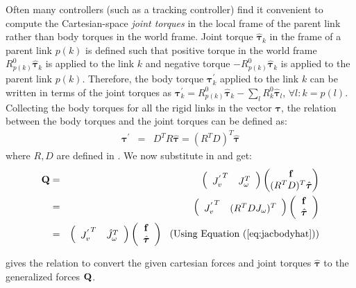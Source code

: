 Often many controllers (such as a tracking controller) find it convenient to compute the Cartesian-space \emph{joint torques} in the local frame of the parent link rather than body torques in the world frame. Joint torque $\hat{\bm{\tau}}_k$ in the frame of a parent link $p(k)$ is defined such that positive torque in the world frame $R^0_{p(k)}\hat{\bm{\tau}}_k$ is applied to the link $k$ and negative torque $-R^0_{p(k)}\hat{\bm{\tau}}_k$ is applied to the parent link $p(k)$. Therefore, the body torque $\bm{\tau}^{'}_k$ applied to the link $k$ can be written in terms of the joint torques as $\bm{\tau}^{'}_k = R^0_{p(k)}\hat{\bm{\tau}}_k - \sum_l R^0_{k} \hat{\bm{\tau}}_l$, $\forall l:k=p(l)$. Collecting the body torques for all the rigid links in the vector $\bm{\tau}$, the relation between the body torques and the joint torques can be defined as:
\begin{eqnarray}
\label{eq:torquesbodyhat}
\bm{\tau}^{'} & = & D^T R \hat{\bm{\tau}} = (R^T D)^T \hat{\bm{\tau}}
\end{eqnarray}
where $R, D$ are defined in . We now substitute  in  and get:
\begin{eqnarray}
\label{eq:torques_cart2gen}
\nonumber
\vc{Q} & = & 
\left (
\begin{array}{cc}
{J^{'}_{v}}^T & J_\omega^T
\end{array}
\right )
\begin{pmatrix}
\vc{f} \\
(R^T D)^T \hat{\bm{\tau}}
\end{pmatrix}
 \\
\nonumber
& = & 
\left (
\begin{array}{cc}
{J^{'}_{v}}^T & (R^T D J_\omega)^T
\end{array}
\right )
\left (
\begin{array}{c}
\vc{f} \\
\hat{\bm{\tau}}
\end{array}
\right )
\\
& = & 
\left (
\begin{array}{cc}
{J^{'}_{v}}^T & \hat{J}_\omega^T
\end{array}
\right )
\left (
\begin{array}{c}
\vc{f} \\
\hat{\bm{\tau}}
\end{array}
\right )  \mbox{\ \ (Using \eqnref{jacbodyhat})}
\end{eqnarray}

 gives the relation to convert the given cartesian forces  and joint torques $\hat{\bm{\tau}}$ to the generalized forces $\mathbf{Q}$. 

